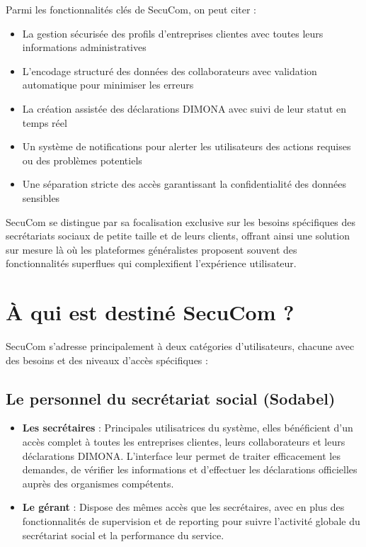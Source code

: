 \documentclass[12pt,a4paper]{report}
\begin{document}
Parmi les fonctionnalités clés de SecuCom, on peut citer :

\begin{itemize}
  \item La gestion sécurisée des profils d'entreprises clientes avec toutes leurs informations administratives
  \item L'encodage structuré des données des collaborateurs avec validation automatique pour minimiser les erreurs
  \item La création assistée des déclarations DIMONA avec suivi de leur statut en temps réel
  \item Un système de notifications pour alerter les utilisateurs des actions requises ou des problèmes potentiels
  \item Une séparation stricte des accès garantissant la confidentialité des données sensibles
\end{itemize}

SecuCom se distingue par sa focalisation exclusive sur les besoins spécifiques des secrétariats sociaux de petite taille et de leurs clients, offrant ainsi une solution sur mesure là où les plateformes généralistes proposent souvent des fonctionnalités superflues qui complexifient l'expérience utilisateur.

\section{À qui est destiné SecuCom ?}

SecuCom s'adresse principalement à deux catégories d'utilisateurs, chacune avec des besoins et des niveaux d'accès spécifiques :

\subsection{Le personnel du secrétariat social (Sodabel)}

\begin{itemize}
  \item \textbf{Les secrétaires} : Principales utilisatrices du système, elles bénéficient d'un accès complet à toutes les entreprises clientes, leurs collaborateurs et leurs déclarations DIMONA. L'interface leur permet de traiter efficacement les demandes, de vérifier les informations et d'effectuer les déclarations officielles auprès des organismes compétents.

  \item \textbf{Le gérant} : Dispose des mêmes accès que les secrétaires, avec en plus des fonctionnalités de supervision et de reporting pour suivre l'activité globale du secrétariat social et la performance du service.
\end{itemize}
\end{document}
